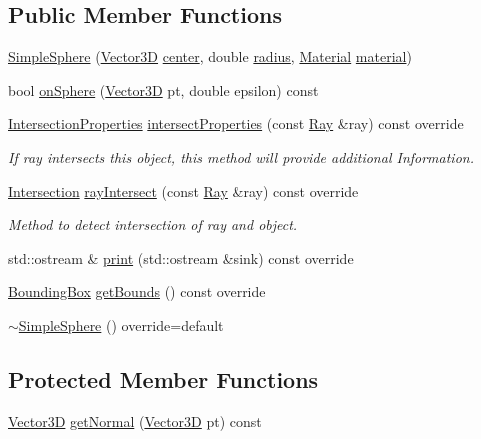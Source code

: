 \subsection*{Public Member Functions}
\begin{DoxyCompactItemize}
\item 
\hyperlink{classSimpleSphere_ae893a4b886a92fe81e1b46766faaf6cd}{Simple\+Sphere} (\hyperlink{classVector3D}{Vector3D} \hyperlink{classSimpleSphere_af432089b8146295c77f52f22835bf1ab}{center}, double \hyperlink{classSimpleSphere_ad69dbac136ee99110f41b7b84656b144}{radius}, \hyperlink{classMaterial}{Material} \hyperlink{classSimpleSphere_abfb049ac4dabb0c7fbb78d7791e33e42}{material})
\item 
bool \hyperlink{classSimpleSphere_aa86dd85d74a4fda533a7dda26ff2ed85}{on\+Sphere} (\hyperlink{classVector3D}{Vector3D} pt, double epsilon) const 
\item 
\hyperlink{classIntersectionProperties}{Intersection\+Properties} \hyperlink{classSimpleSphere_aa16a61ff59fe30d968b8f2284219b64f}{intersect\+Properties} (const \hyperlink{classRay}{Ray} \&ray) const override
\begin{DoxyCompactList}\small\item\em If ray intersects this object, this method will provide additional Information. \end{DoxyCompactList}\item 
\hyperlink{classIntersection}{Intersection} \hyperlink{classSimpleSphere_a657a5c5ba7a2e0621a49923de9f7ea45}{ray\+Intersect} (const \hyperlink{classRay}{Ray} \&ray) const override
\begin{DoxyCompactList}\small\item\em Method to detect intersection of ray and object. \end{DoxyCompactList}\item 
std\+::ostream \& \hyperlink{classSimpleSphere_a2da3c9e41a8d8e6ec4012343ea0fa793}{print} (std\+::ostream \&sink) const override
\item 
\hyperlink{classBoundingBox}{Bounding\+Box} \hyperlink{classSimpleSphere_a95670bb33ef32e61dc4c2750ac9cf5a3}{get\+Bounds} () const override
\item 
\hyperlink{classSimpleSphere_a7ffaeb08624ecd5c91ed88c10f2fbff7}{$\sim$\+Simple\+Sphere} () override=default
\end{DoxyCompactItemize}
\subsection*{Protected Member Functions}
\begin{DoxyCompactItemize}
\item 
\hyperlink{classVector3D}{Vector3D} \hyperlink{classSimpleSphere_a3661d89a607462f612c1e751b76e4556}{get\+Normal} (\hyperlink{classVector3D}{Vector3D} pt) const 
\end{DoxyCompactItemize}
